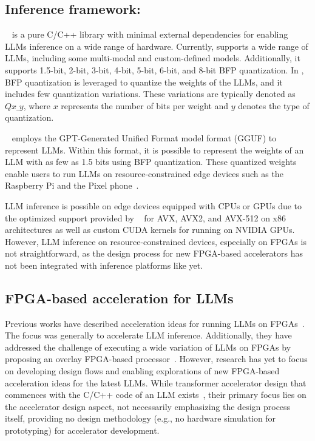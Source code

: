 \subsection{Inference framework: \LPP}

\LPP~\cite{LLP} is a pure C/C++ library with minimal external dependencies for enabling LLMs inference on a wide range of hardware.
Currently, \LPP supports a wide range of LLMs, including some multi-modal and custom-defined models.
Additionally, it supports 1.5-bit, 2-bit, 3-bit, 4-bit, 5-bit, 6-bit, and 8-bit BFP quantization.
In \LPP, BFP quantization is leveraged to quantize the weights of the LLMs, and it includes few quantization variations.
These variations are typically denoted as \( Q{x\_y} \), where \( x \) represents the number of bits per weight and \( y \) denotes the type of quantization.

\LPP~\cite{LLP} employs the GPT-Generated Unified Format model format (GGUF) to represent LLMs.
Within this format, it is possible to represent the weights of an LLM with as few as 1.5 bits using BFP quantization.
These quantized weights enable users to run LLMs on resource-constrained edge devices such as the Raspberry Pi and the Pixel phone~\cite{simonwillison}.

LLM inference is possible on edge devices equipped with CPUs or GPUs due to the optimized support provided by \LPP~\cite{LLP} for AVX, AVX2, and AVX-512 on x86 architectures as well as custom CUDA kernels for running on NVIDIA GPUs.
However, LLM inference on resource-constrained devices, especially on FPGAs is not straightforward, as the design process for new FPGA-based accelerators has not been integrated with inference platforms like \LPP yet.
 


\subsection{FPGA-based acceleration for LLMs}

Previous works have described acceleration ideas for running LLMs on FPGAs~\cite{Kachris2024Survey}.
The focus was generally to accelerate LLM inference.
Additionally, they have addressed the challenge of executing a wide variation of LLMs on FPGAs by proposing an overlay FPGA-based processor~\cite{Khan2021NPE}.
However, research has yet to focus on developing design flows and enabling explorations of new FPGA-based acceleration ideas for the latest LLMs.
While transformer accelerator design that commences with the C/C++ code of an LLM exists~\cite{Lu2020Transformer}, their primary focus lies on the accelerator design aspect, not necessarily emphasizing the design process itself, providing no design methodology (e.g., no hardware simulation for prototyping) for accelerator development.


